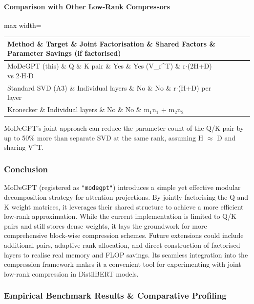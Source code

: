\paragraph{Comparison with Other Low-Rank Compressors}

\begin{center}
\begin{adjustbox}{max width=\columnwidth}
\renewcommand{\arraystretch}{1.2}
\begin{tabular}{lllll}
\toprule
Method \& Target \& Joint Factorisation \& Shared Factors \& Parameter Savings (if factorised) \\
\midrule
MoDeGPT (this) \& Q \& K pair \& Yes \& Yes (V\_r\textasciicircum{}T) \& r$\cdot$(2H+D) vs 2$\cdot$H$\cdot$D \\
Standard SVD (A3) \& Individual layers \& No \& No \& r$\cdot$(H+D) per layer \\
Kronecker \& Individual layers \& No \& No \& m$_1$n$_1$ + m$_2$n$_2$ \\

\bottomrule
\end{tabular}
\end{adjustbox}
\end{center}
MoDeGPT's joint approach can reduce the parameter count of the Q/K pair by up to 50\% more than separate SVD at the same rank, assuming H $\approx$ D and sharing V\textasciicircum{}T.


\subsubsection*{Conclusion}

MoDeGPT (registered as \texttt{"modegpt"}) introduces a simple yet effective modular decomposition strategy for attention projections. By jointly factorising the Q and K weight matrices, it leverages their shared structure to achieve a more efficient low-rank approximation. While the current implementation is limited to Q/K pairs and still stores dense weights, it lays the groundwork for more comprehensive block-wise compression schemes. Future extensions could include additional pairs, adaptive rank allocation, and direct construction of factorised layers to realise real memory and FLOP savings. Its seamless integration into the compression framework makes it a convenient tool for experimenting with joint low-rank compression in DistilBERT models.

\subsubsection*{Empirical Benchmark Results \& Comparative Profiling}

